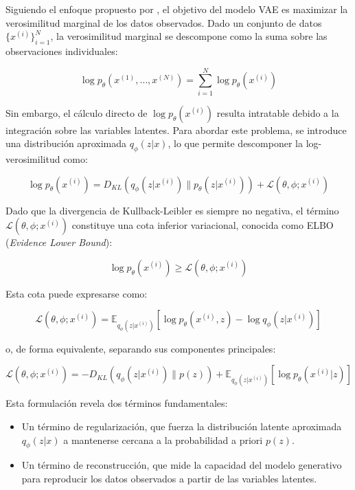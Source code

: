 Siguiendo el enfoque propuesto por \cite{kingma2013auto}, el objetivo del modelo VAE es maximizar la verosimilitud marginal de los datos observados. Dado un conjunto de datos $\{x^{(i)}\}_{i=1}^{N}$, la verosimilitud marginal se descompone como la suma sobre las observaciones individuales:

\begin{equation}
\log p_{\theta}(x^{(1)}, \ldots, x^{(N)})
=
\sum_{i=1}^{N} \log p_{\theta}(x^{(i)})
\end{equation}

Sin embargo, el cálculo directo de $\log p_{\theta}(x^{(i)})$ resulta intratable debido a la integración sobre las variables latentes. Para abordar este problema, se introduce una distribución aproximada $q_{\phi}(z|x)$, lo que permite descomponer la log-verosimilitud como:

\begin{equation}
\log p_{\theta}(x^{(i)})
=
D_{KL}
\left(
q_{\phi}(z|x^{(i)})
\parallel
p_{\theta}(z|x^{(i)})
\right)
+
\mathcal{L}(\theta,\phi;x^{(i)})
\end{equation}

Dado que la divergencia de Kullback-Leibler es siempre no negativa, el término $\mathcal{L}(\theta,\phi;x^{(i)})$ constituye una cota inferior variacional, conocida como ELBO (\textit{Evidence Lower Bound}):

\begin{equation}
\log p_{\theta}(x^{(i)})
\geq
\mathcal{L}(\theta,\phi;x^{(i)})
\end{equation}

Esta cota puede expresarse como:

\begin{equation}
\mathcal{L}(\theta,\phi;x^{(i)})
=
\mathbb{E}_{q_{\phi}(z|x^{(i)})}
\left[
\log p_{\theta}(x^{(i)},z)
-
\log q_{\phi}(z|x^{(i)})
\right]
\end{equation}

o, de forma equivalente, separando sus componentes principales:

\begin{equation}
\mathcal{L}(\theta,\phi;x^{(i)})
=
-D_{KL}
\left(
q_{\phi}(z|x^{(i)})
\parallel
p(z)
\right)
+
\mathbb{E}_{q_{\phi}(z|x^{(i)})}
\left[
\log p_{\theta}(x^{(i)}|z)
\right]
\end{equation}

Esta formulación revela dos términos fundamentales:

\begin{itemize}
\item Un término de regularización, que fuerza la distribución latente aproximada $q_{\phi}(z|x)$ a mantenerse cercana a la probabilidad a priori $p(z)$.
\item Un término de reconstrucción, que mide la capacidad del modelo generativo para reproducir los datos observados a partir de las variables latentes.
\end{itemize}

